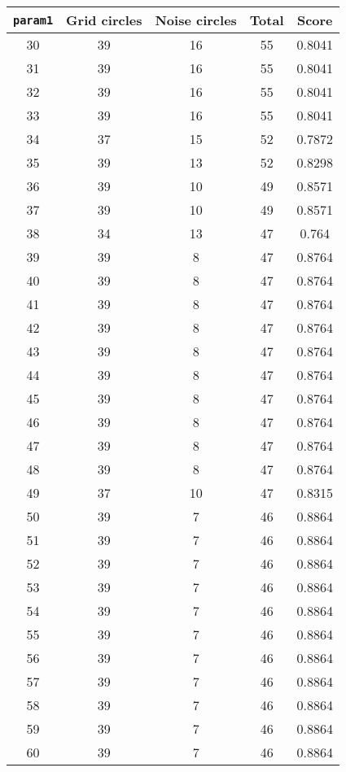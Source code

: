 \documentclass[letterpaper, 12pt]{article}
\begin{document}
\begin{longtable}{|c|c|c|c|c|}
\hline
\textbf{\texttt{param1}} & \textbf{Grid circles} & \textbf{Noise circles} & \textbf{Total} & \textbf{Score} \\
\hline
30 & 39 & 16 & 55 & 0.8041 \\
\hline
31 & 39 & 16 & 55 & 0.8041 \\
\hline
32 & 39 & 16 & 55 & 0.8041 \\
\hline
33 & 39 & 16 & 55 & 0.8041 \\
\hline
34 & 37 & 15 & 52 & 0.7872 \\
\hline
35 & 39 & 13 & 52 & 0.8298 \\
\hline
36 & 39 & 10 & 49 & 0.8571 \\
\hline
37 & 39 & 10 & 49 & 0.8571 \\
\hline
38 & 34 & 13 & 47 & 0.764 \\
\hline
39 & 39 & 8 & 47 & 0.8764 \\
\hline
40 & 39 & 8 & 47 & 0.8764 \\
\hline
41 & 39 & 8 & 47 & 0.8764 \\
\hline
42 & 39 & 8 & 47 & 0.8764 \\
\hline
43 & 39 & 8 & 47 & 0.8764 \\
\hline
44 & 39 & 8 & 47 & 0.8764 \\
\hline
45 & 39 & 8 & 47 & 0.8764 \\
\hline
46 & 39 & 8 & 47 & 0.8764 \\
\hline
47 & 39 & 8 & 47 & 0.8764 \\
\hline
48 & 39 & 8 & 47 & 0.8764 \\
\hline
49 & 37 & 10 & 47 & 0.8315 \\
\hline
50 & 39 & 7 & 46 & 0.8864 \\
\hline
51 & 39 & 7 & 46 & 0.8864 \\
\hline
52 & 39 & 7 & 46 & 0.8864 \\
\hline
53 & 39 & 7 & 46 & 0.8864 \\
\hline
54 & 39 & 7 & 46 & 0.8864 \\
\hline
55 & 39 & 7 & 46 & 0.8864 \\
\hline
56 & 39 & 7 & 46 & 0.8864 \\
\hline
57 & 39 & 7 & 46 & 0.8864 \\
\hline
58 & 39 & 7 & 46 & 0.8864 \\
\hline
59 & 39 & 7 & 46 & 0.8864 \\
\hline
60 & 39 & 7 & 46 & 0.8864 \\
\hline

\end{longtable}
\end{document}
